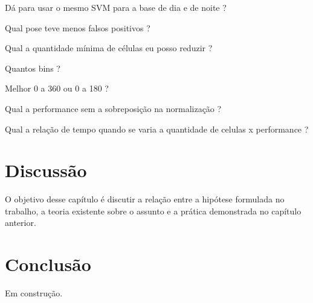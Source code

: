Dá para usar o mesmo SVM para a base de dia e de noite ?

Qual pose teve menos falsos positivos ?

Qual a quantidade mínima de células eu posso reduzir ?

Quantos bins ?

Melhor 0 a 360 ou 0 a 180 ?

Qual a performance sem a sobreposição na normalização ?

Qual a relação de tempo quando se varia a quantidade de celulas x performance ?



\chapter{Discussão}

O objetivo desse capítulo é discutir a relação entre a hipótese formulada no trabalho, a teoria existente sobre o assunto e a prática demonstrada no capítulo anterior.

\chapter{Conclusão}

Em construção.